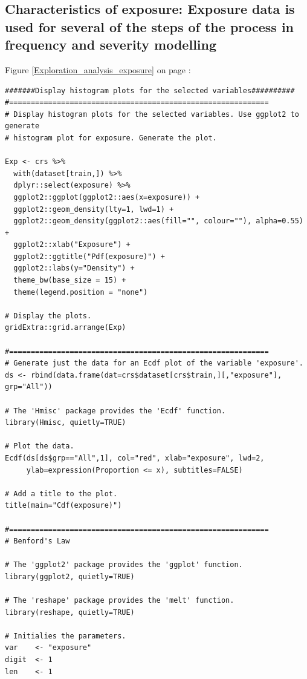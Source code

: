 \documentclass{DissertateUSU}
\begin{document}
\normalsize

\subsection{Characteristics of exposure: Exposure data is used for several of the steps of the process in frequency and severity modelling}
\label{ssec:Characteristics of exposure}

Figure \ref{Exploration_analysis_exposure} on page
\pageref{Exploration_analysis_exposure}:

\small

\begin{verbatim}
#######Display histogram plots for the selected variables##########
#============================================================
# Display histogram plots for the selected variables. Use ggplot2 to generate
# histogram plot for exposure. Generate the plot.

Exp <- crs %>%
  with(dataset[train,]) %>%
  dplyr::select(exposure) %>%
  ggplot2::ggplot(ggplot2::aes(x=exposure)) +
  ggplot2::geom_density(lty=1, lwd=1) +
  ggplot2::geom_density(ggplot2::aes(fill="", colour=""), alpha=0.55) +
  ggplot2::xlab("Exposure") +
  ggplot2::ggtitle("Pdf(exposure)") +
  ggplot2::labs(y="Density") +
  theme_bw(base_size = 15) +
  theme(legend.position = "none")

# Display the plots.
gridExtra::grid.arrange(Exp)

#============================================================
# Generate just the data for an Ecdf plot of the variable 'exposure'.
ds <- rbind(data.frame(dat=crs$dataset[crs$train,][,"exposure"], grp="All"))

# The 'Hmisc' package provides the 'Ecdf' function.
library(Hmisc, quietly=TRUE)

# Plot the data.
Ecdf(ds[ds$grp=="All",1], col="red", xlab="exposure", lwd=2, 
     ylab=expression(Proportion <= x), subtitles=FALSE)

# Add a title to the plot.
title(main="Cdf(exposure)")
    
#============================================================
# Benford's Law 

# The 'ggplot2' package provides the 'ggplot' function.
library(ggplot2, quietly=TRUE)

# The 'reshape' package provides the 'melt' function.
library(reshape, quietly=TRUE)

# Initialies the parameters.
var    <- "exposure"
digit  <- 1
len    <- 1


\end{verbatim}
\end{document}
